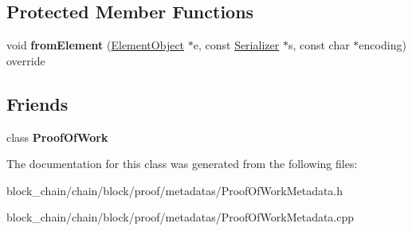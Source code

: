 \subsection*{Protected Member Functions}
\begin{DoxyCompactItemize}
\item 
\mbox{\label{classProofOfWorkMetadata_afac533eee3123bce72615ab90f7c9669}} 
void {\bfseries from\+Element} (\mbox{\hyperlink{classElementObject}{Element\+Object}} $\ast$e, const \mbox{\hyperlink{classSerializer}{Serializer}} $\ast$s, const char $\ast$encoding) override
\end{DoxyCompactItemize}
\subsection*{Friends}
\begin{DoxyCompactItemize}
\item 
\mbox{\label{classProofOfWorkMetadata_a5493b64dfe8bc707452f326c6ec29f14}} 
class {\bfseries Proof\+Of\+Work}
\end{DoxyCompactItemize}


The documentation for this class was generated from the following files\+:\begin{DoxyCompactItemize}
\item 
block\+\_\+chain/chain/block/proof/metadatas/Proof\+Of\+Work\+Metadata.\+h\item 
block\+\_\+chain/chain/block/proof/metadatas/Proof\+Of\+Work\+Metadata.\+cpp\end{DoxyCompactItemize}
